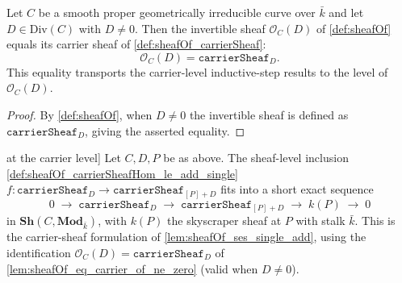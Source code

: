 \begin{lemma}

  \label{lem:sheafOf_eq_carrier_of_ne_zero}
  Let \(C\) be a smooth proper geometrically irreducible curve over \(\bar k\)
  and let \(D \in \mathrm{Div}(C)\) with \(D \neq 0\). Then the invertible
  sheaf \(\mathcal O_C(D)\) of \cref{def:sheafOf} equals its carrier sheaf
  of \cref{def:sheafOf_carrierSheaf}:
  \[
    \mathcal O_C(D) = \texttt{carrierSheaf}_D.
  \]
  This equality transports the carrier-level inductive-step results to the
  level of \(\mathcal O_C(D)\).
\end{lemma}

\begin{proof}
  By \cref{def:sheafOf}, when \(D \neq 0\) the invertible sheaf is defined
  as \(\texttt{carrierSheaf}_D\), giving the asserted equality.
\end{proof}

\begin{theorem}

\leanok
[Short exact sequence for \(D \rightsquigarrow D + [P]\) at the carrier level]
  \label{thm:sheafOf_carrierSheaf_ses_single_add}
  Let \(C, D, P\) be as above. The sheaf-level inclusion
  \cref{def:sheafOf_carrierSheafHom_le_add_single}
  \(f : \texttt{carrierSheaf}_D \to \texttt{carrierSheaf}_{[P]+D}\) fits into a
  short exact sequence
  \[
    0 \;\longrightarrow\; \texttt{carrierSheaf}_D
    \;\longrightarrow\; \texttt{carrierSheaf}_{[P]+D}
    \;\longrightarrow\; k(P)
    \;\longrightarrow\; 0
  \]
  in \(\mathbf{Sh}(C, \mathbf{Mod}_{\bar k})\), with \(k(P)\) the skyscraper
  sheaf at \(P\) with stalk \(\bar k\). This is the carrier-sheaf formulation
  of \cref{lem:sheafOf_ses_single_add}, using the identification
  \(\mathcal O_C(D) = \texttt{carrierSheaf}_D\) of
  \cref{lem:sheafOf_eq_carrier_of_ne_zero} (valid when \(D \neq 0\)).
\end{theorem}

